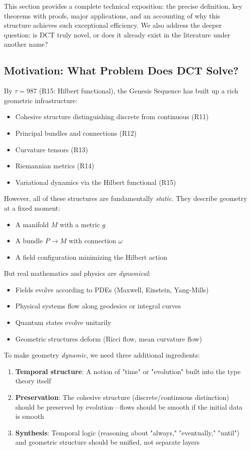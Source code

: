 \documentclass[11pt]{article}
\theoremstyle{definition}
\begin{document}
This section provides a complete technical exposition: the precise definition, key theorems with proofs, major applications, and an accounting of why this structure achieves such exceptional efficiency. We also address the deeper question: is DCT truly novel, or does it already exist in the literature under another name?

\subsection{Motivation: What Problem Does DCT Solve?}

By $\tau=987$ (R15: Hilbert functional), the Genesis Sequence has built up a rich geometric infrastructure:
\begin{itemize}
\item Cohesive structure distinguishing discrete from continuous (R11)
\item Principal bundles and connections (R12)
\item Curvature tensors (R13)
\item Riemannian metrics (R14)
\item Variational dynamics via the Hilbert functional (R15)
\end{itemize}

However, all of these structures are fundamentally \emph{static}. They describe geometry at a fixed moment:
\begin{itemize}
\item A manifold $M$ with a metric $g$
\item A bundle $P \to M$ with connection $\omega$
\item A field configuration minimizing the Hilbert action
\end{itemize}

But real mathematics and physics are \emph{dynamical}:
\begin{itemize}
\item Fields evolve according to PDEs (Maxwell, Einstein, Yang-Mills)
\item Physical systems flow along geodesics or integral curves
\item Quantum states evolve unitarily
\item Geometric structures deform (Ricci flow, mean curvature flow)
\end{itemize}

To make geometry \emph{dynamic}, we need three additional ingredients:

\begin{enumerate}
\item \textbf{Temporal structure}: A notion of "time" or "evolution" built into the type theory itself

\item \textbf{Preservation}: The cohesive structure (discrete/continuous distinction) should be preserved by evolution—flows should be smooth if the initial data is smooth

\item \textbf{Synthesis}: Temporal logic (reasoning about "always," "eventually," "until") and geometric structure should be unified, not separate layers
\end{enumerate}
\end{document}

